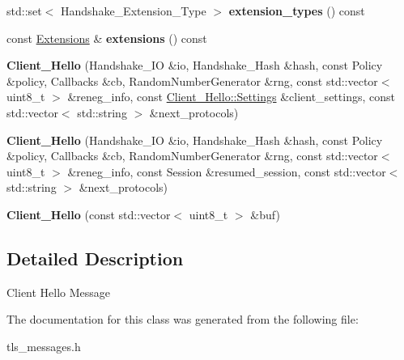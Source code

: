 \begin{DoxyCompactItemize}
std\+::set$<$ Handshake\+\_\+\+Extension\+\_\+\+Type $>$ {\bfseries extension\+\_\+types} () const
\item 
\mbox{\label{class_botan_1_1_t_l_s_1_1_client___hello_a3d3139562dc4d0d9b9e017f2da87da9a}} 
const \hyperlink{class_botan_1_1_t_l_s_1_1_extensions}{Extensions} \& {\bfseries extensions} () const
\item 
\mbox{\label{class_botan_1_1_t_l_s_1_1_client___hello_a23b5ddd3f8874d4f21735caf1b8a74bf}} 
{\bfseries Client\+\_\+\+Hello} (Handshake\+\_\+\+IO \&io, Handshake\+\_\+\+Hash \&hash, const Policy \&policy, Callbacks \&cb, Random\+Number\+Generator \&rng, const std\+::vector$<$ uint8\+\_\+t $>$ \&reneg\+\_\+info, const \hyperlink{class_botan_1_1_t_l_s_1_1_client___hello_1_1_settings}{Client\+\_\+\+Hello\+::\+Settings} \&client\+\_\+settings, const std\+::vector$<$ std\+::string $>$ \&next\+\_\+protocols)
\item 
\mbox{\label{class_botan_1_1_t_l_s_1_1_client___hello_afac7f76bc1d5da48d139db2ccdbc01fa}} 
{\bfseries Client\+\_\+\+Hello} (Handshake\+\_\+\+IO \&io, Handshake\+\_\+\+Hash \&hash, const Policy \&policy, Callbacks \&cb, Random\+Number\+Generator \&rng, const std\+::vector$<$ uint8\+\_\+t $>$ \&reneg\+\_\+info, const Session \&resumed\+\_\+session, const std\+::vector$<$ std\+::string $>$ \&next\+\_\+protocols)
\item 
\mbox{\label{class_botan_1_1_t_l_s_1_1_client___hello_a6344772d277964e5e413cd3bd9fa6dda}} 
{\bfseries Client\+\_\+\+Hello} (const std\+::vector$<$ uint8\+\_\+t $>$ \&buf)
\end{DoxyCompactItemize}


\subsection{Detailed Description}
Client Hello Message 

The documentation for this class was generated from the following file\+:\begin{DoxyCompactItemize}
\item 
tls\+\_\+messages.\+h\end{DoxyCompactItemize}
